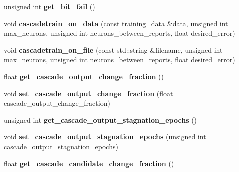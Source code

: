 \begin{DoxyCompactItemize}
\item 
\hypertarget{class_f_a_n_n_1_1neural__net_af5066345d84cb22f8b869c5d58fe46f8}{unsigned int {\bfseries get\-\_\-bit\-\_\-fail} ()}\label{class_f_a_n_n_1_1neural__net_af5066345d84cb22f8b869c5d58fe46f8}

\item 
\hypertarget{class_f_a_n_n_1_1neural__net_aae8973a3658c7e7b51087408f46c3596}{void {\bfseries cascadetrain\-\_\-on\-\_\-data} (const \hyperlink{class_f_a_n_n_1_1training__data}{training\-\_\-data} \&data, unsigned int max\-\_\-neurons, unsigned int neurons\-\_\-between\-\_\-reports, float desired\-\_\-error)}\label{class_f_a_n_n_1_1neural__net_aae8973a3658c7e7b51087408f46c3596}

\item 
\hypertarget{class_f_a_n_n_1_1neural__net_a9e567c4d3a54e3f02377c5f974252662}{void {\bfseries cascadetrain\-\_\-on\-\_\-file} (const std\-::string \&filename, unsigned int max\-\_\-neurons, unsigned int neurons\-\_\-between\-\_\-reports, float desired\-\_\-error)}\label{class_f_a_n_n_1_1neural__net_a9e567c4d3a54e3f02377c5f974252662}

\item 
\hypertarget{class_f_a_n_n_1_1neural__net_aa35a509b8843265fb7261222edb8b175}{float {\bfseries get\-\_\-cascade\-\_\-output\-\_\-change\-\_\-fraction} ()}\label{class_f_a_n_n_1_1neural__net_aa35a509b8843265fb7261222edb8b175}

\item 
\hypertarget{class_f_a_n_n_1_1neural__net_abf806c18176e9e8ff0e59c39fa1c504c}{void {\bfseries set\-\_\-cascade\-\_\-output\-\_\-change\-\_\-fraction} (float cascade\-\_\-output\-\_\-change\-\_\-fraction)}\label{class_f_a_n_n_1_1neural__net_abf806c18176e9e8ff0e59c39fa1c504c}

\item 
\hypertarget{class_f_a_n_n_1_1neural__net_ab593ed32338fe6ee1ac9e8328b9bce2d}{unsigned int {\bfseries get\-\_\-cascade\-\_\-output\-\_\-stagnation\-\_\-epochs} ()}\label{class_f_a_n_n_1_1neural__net_ab593ed32338fe6ee1ac9e8328b9bce2d}

\item 
\hypertarget{class_f_a_n_n_1_1neural__net_aaaa62d62fdc9803ef51da1b0c7f37e53}{void {\bfseries set\-\_\-cascade\-\_\-output\-\_\-stagnation\-\_\-epochs} (unsigned int cascade\-\_\-output\-\_\-stagnation\-\_\-epochs)}\label{class_f_a_n_n_1_1neural__net_aaaa62d62fdc9803ef51da1b0c7f37e53}

\item 
\hypertarget{class_f_a_n_n_1_1neural__net_a2a4a4a00a589e02e50724edb3ec65889}{float {\bfseries get\-\_\-cascade\-\_\-candidate\-\_\-change\-\_\-fraction} ()}\label{class_f_a_n_n_1_1neural__net_a2a4a4a00a589e02e50724edb3ec65889}


\end{DoxyCompactItemize}
